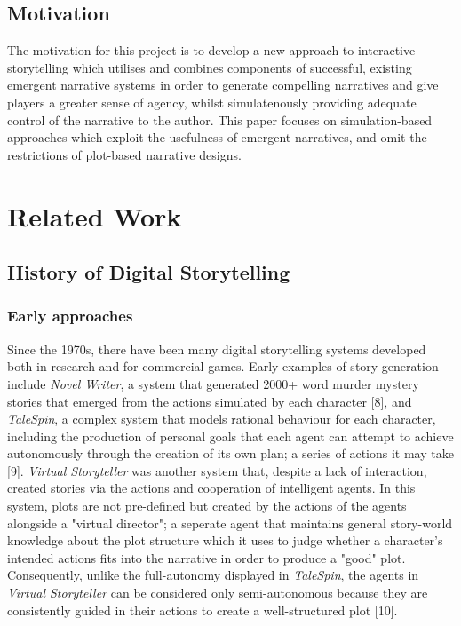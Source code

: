 \documentclass{sig-alternate-05-2015}
\begin{document}
\subsection{Motivation}

\noindent The motivation for this project is to develop a new approach to interactive storytelling which utilises and combines components of successful, existing emergent narrative systems in order to generate compelling narratives and give players a greater sense of agency, whilst simulatenously providing adequate control of the narrative to the author. This paper focuses on simulation-based approaches which exploit the usefulness of emergent narratives, and omit the restrictions of plot-based narrative designs.

\section{Related Work}
\subsection{History of Digital Storytelling}
\subsubsection{Early approaches}
Since the 1970s, there have been many digital storytelling systems developed both in research and for commercial games. Early examples of story generation include \textit{Novel Writer}, a system that generated 2000+ word murder mystery stories that emerged from the actions simulated by each character [8], and \textit{TaleSpin}, a complex system that models rational behaviour for each character, including the production of personal goals that each agent can attempt to achieve autonomously through the creation of its own plan; a series of actions it may take [9]. \textit{Virtual Storyteller} was another system that, despite a lack of interaction, created stories via the actions and cooperation of intelligent agents. In this system, plots are not pre-defined but created by the actions of the agents alongside a "virtual director"; a seperate agent that maintains general story-world knowledge about the plot structure which it uses to judge whether a character's intended actions fits into the narrative in order to produce a "good" plot. Consequently, unlike the full-autonomy displayed in \textit{TaleSpin}, the agents in \textit{Virtual Storyteller} can be considered only semi-autonomous because they are consistently guided in their actions to create a well-structured plot [10]. 
\end{document}
